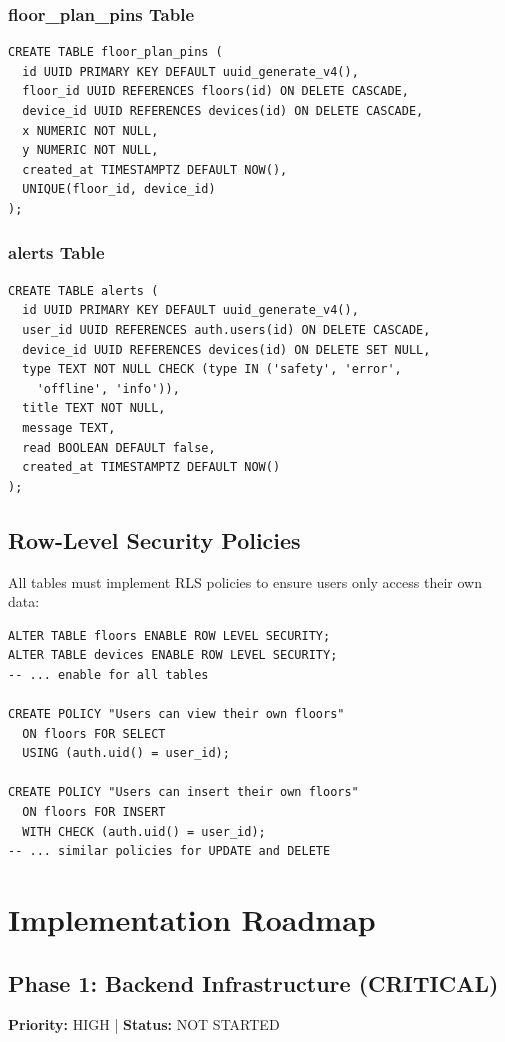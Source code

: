 \documentclass[12pt,a4paper]{article}
\begin{document}
\subsubsection{floor\_plan\_pins Table}
\begin{verbatim}
CREATE TABLE floor_plan_pins (
  id UUID PRIMARY KEY DEFAULT uuid_generate_v4(),
  floor_id UUID REFERENCES floors(id) ON DELETE CASCADE,
  device_id UUID REFERENCES devices(id) ON DELETE CASCADE,
  x NUMERIC NOT NULL,
  y NUMERIC NOT NULL,
  created_at TIMESTAMPTZ DEFAULT NOW(),
  UNIQUE(floor_id, device_id)
);
\end{verbatim}

\subsubsection{alerts Table}
\begin{verbatim}
CREATE TABLE alerts (
  id UUID PRIMARY KEY DEFAULT uuid_generate_v4(),
  user_id UUID REFERENCES auth.users(id) ON DELETE CASCADE,
  device_id UUID REFERENCES devices(id) ON DELETE SET NULL,
  type TEXT NOT NULL CHECK (type IN ('safety', 'error', 
    'offline', 'info')),
  title TEXT NOT NULL,
  message TEXT,
  read BOOLEAN DEFAULT false,
  created_at TIMESTAMPTZ DEFAULT NOW()
);
\end{verbatim}

\subsection{Row-Level Security Policies}
All tables must implement RLS policies to ensure users only access their own data:

\begin{verbatim}
ALTER TABLE floors ENABLE ROW LEVEL SECURITY;
ALTER TABLE devices ENABLE ROW LEVEL SECURITY;
-- ... enable for all tables

CREATE POLICY "Users can view their own floors"
  ON floors FOR SELECT
  USING (auth.uid() = user_id);

CREATE POLICY "Users can insert their own floors"
  ON floors FOR INSERT
  WITH CHECK (auth.uid() = user_id);
-- ... similar policies for UPDATE and DELETE
\end{verbatim}


\newpage
\section{Implementation Roadmap}

\subsection{Phase 1: Backend Infrastructure (CRITICAL)}
\textbf{Priority:} HIGH | \textbf{Status:} \textcolor{required}{NOT STARTED}
\end{document}
